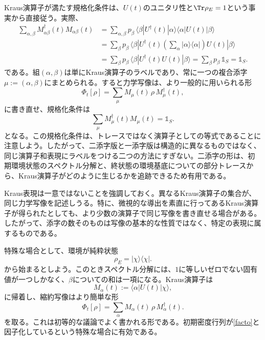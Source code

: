 \documentclass[a4paper,11pt,oneside]{article}
\theoremstyle{definition}
\numberwithin{equation}{section}
\begin{document}
Kraus演算子が満たす規格化条件は、$U(t)$のユニタリ性と$\Tr \rho_E = 1$という事実から直接従う。実際、
\begin{align}
\sum_{\alpha,\beta} M_{\alpha\beta}^\dagger(t) M_{\alpha\beta}(t)
&=
\sum_{\alpha,\beta}
p_\beta\,
\langle \beta|U^\dagger(t)|\alpha\rangle
\langle \alpha|U(t)|\beta\rangle
\nonumber\\
&=
\sum_\beta
p_\beta\,
\langle \beta|U^\dagger(t)\left(\sum_\alpha |\alpha\rangle\langle\alpha|\right)U(t)|\beta\rangle
\nonumber\\
&=
\sum_\beta
p_\beta\,
\langle \beta|U^\dagger(t)U(t)|\beta\rangle=
\sum_\beta p_\beta\,\mathds{1} _S=
\mathds{1} _S .
\end{align}
である。組$(\alpha,\beta)$は単にKraus演算子のラベルであり、常に一つの複合添字$\mu := (\alpha,\beta)  $にまとめられる。すると力学写像は、より一般的に用いられる形
\begin{equation}\label{krausoneindex}
\Phi_t[\rho] = \sum_\mu M_\mu(t)\,\rho\,M_\mu^\dagger(t) ,
\end{equation}
に書き直せ、規格化条件は
\begin{equation}\label{krausnorm}
\sum_\mu M_\mu^\dagger(t) M_\mu(t)=\mathds{1} _S .
\end{equation}
となる。この規格化条件は、トレースではなく演算子としての等式であることに注意しよう。したがって、二添字版と一添字版は構造的に異なるものではなく、同じ演算子和表現にラベルをつける二つの方法にすぎない。二添字の形は、初期環境状態のスペクトル分解と、終状態の環境基底についての部分トレースから、Kraus演算子がどのように生じるかを追跡できるため有用である。



Kraus表現は一意ではないことを強調しておく。異なるKraus演算子の集合が、同じ力学写像を記述しうる。特に、微視的な導出を素直に行ってあるKraus演算子が得られたとしても、より少数の演算子で同じ写像を書き直せる場合がある。したがって、添字の数そのものは写像の基本的な性質ではなく、特定の表現に属するものである。



特殊な場合として、環境が純粋状態
\begin{equation}
\rho_E = |\chi\rangle\langle\chi| .
\end{equation}
から始まるとしよう。このときスペクトル分解には、$1$に等しいゼロでない固有値が一つしかなく、$\beta$についての和は一項になる。Kraus演算子は
\begin{equation}
M_\alpha(t) := \langle \alpha|U(t)|\chi\rangle ,
\end{equation}
に帰着し、縮約写像はより簡単な形
\begin{equation}
\Phi_t[\rho] = \sum_\alpha M_\alpha(t)\,\rho\,M_\alpha^\dagger(t) .
\end{equation}
を取る。これは初等的な議論でよく書かれる形である。初期密度行列が\eqref{facto}と因子化しているという特殊な場合に有効である。
\end{document}
